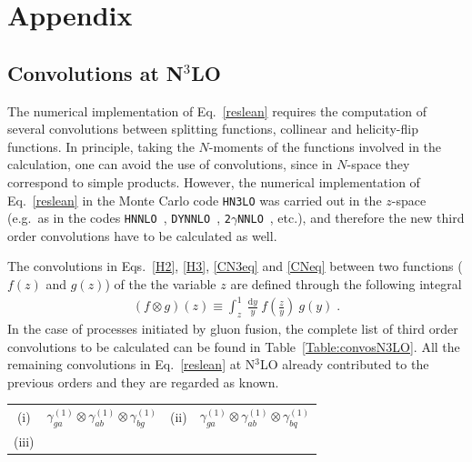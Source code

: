 \documentclass[12pt]{article}
\def\beeq{\begin{eqnarray}}
\def\eeeq{\end{eqnarray}}
\newcommand\f[2]{\frac{#1}{#2}}
\DeclareRobustCommand{\rd}{\ensuremath{\mathrm{d}}}
\begin{document}
\section*{Appendix}
\begin{appendix}
\section{Convolutions at \texorpdfstring{N${}^\text{3}$LO}{N3LO}}
\label{app:Convos}
The numerical implementation of Eq.~\eqref{reslean} requires the computation of several convolutions between splitting functions, collinear and helicity-flip functions. In principle, taking the $N$-moments of the functions involved in the calculation, one can avoid the use of convolutions, since in $N$-space they correspond to simple products. However, the numerical implementation of Eq.~\eqref{reslean} in the Monte Carlo code \texttt{HN3LO} was carried out in the $z$-space (e.g.\ as in the codes \texttt{HNNLO}~\cite{Catani:2007vq}, \texttt{DYNNLO}~\cite{Catani:2009sm}, \texttt{2$\gamma$NNLO}~\cite{Catani:2011qz}, etc.), and therefore the new third order convolutions have to be calculated as well. 

The convolutions in Eqs.~\eqref{H2}, \eqref{H3}, \eqref{CN3eq} and \eqref{CNeq} between two functions ($f(z)$ and $g(z)$) of the the variable $z$ are defined through the following integral
\beeq
\left( f \otimes g \right)(z) \equiv \int^{1}_{z}~\f{\rd y}{y}~f\left(\f{z}{y}\right)~g(y)\;.
\eeeq
In the case of processes initiated by gluon fusion, the complete list of third order convolutions to be calculated can be found in Table~\ref{Table:convosN3LO}. All the remaining convolutions in Eq.~\eqref{reslean} at N$^{3}$LO already  contributed to the previous orders and they are regarded as known.

\begin{table}
\centering
\renewcommand{\arraystretch}{1.5}
\begin{tabular}{ |c|c||c|c| }
\hline
\multirow{1}{*}{(i)} 

& $\gamma^{(1)}_{ga}\otimes\gamma^{(1)}_{a b}\otimes\gamma^{(1)}_{bg}$

& \multirow{1}{*}{(ii)} 

& $\gamma^{(1)}_{ga}\otimes\gamma^{(1)}_{ab}\otimes\gamma^{(1)}_{bq}$  \\


\multirow{1}{*}{(iii)} 


\end{tabular}
\end{table}
\end{appendix}
\end{document}
